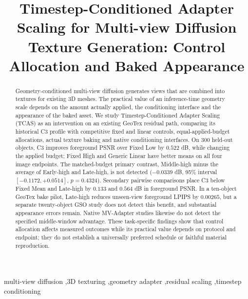 \documentclass[times,twocolumn,final]{elsarticle}
\begin{document}
\begin{frontmatter}

\title{Timestep-Conditioned Adapter Scaling for Multi-view Diffusion Texture Generation: Control Allocation and Baked Appearance}


\begin{abstract}
Geometry-conditioned multi-view diffusion generates views that are combined into textures for existing 3D meshes. The practical value of an inference-time geometry scale depends on the amount actually applied, the conditioning interface and the appearance of the baked asset. We study Timestep-Conditioned Adapter Scaling (TCAS) as an intervention on an existing GeoTex residual path, comparing its historical C3 profile with competitive fixed and linear controls, equal-applied-budget allocations, actual texture baking and native conditioning interfaces. On 300 held-out objects, C3 improves foreground PSNR over Fixed Low by $0.522$ dB, while changing the applied budget; Fixed High and Generic Linear have better means on all four image endpoints. The matched-budget primary contrast, Middle-high minus the average of Early-high and Late-high, is not detected ($-0.0339$ dB, 95\% interval $[-0.1172,+0.0514]$, $p=0.4324$). Secondary pairwise comparisons place C3 below Fixed Mean and Late-high by $0.133$ and $0.564$ dB in foreground PSNR. In a ten-object GeoTex bake pilot, Late-high reduces unseen-view foreground LPIPS by $0.00265$, but a separate twenty-object GSO study does not detect this benefit, and substantial appearance errors remain. Native MV-Adapter studies likewise do not detect the specified middle-window advantage. These task-specific findings show that control allocation affects measured outcomes while its practical value depends on protocol and endpoint; they do not establish a universally preferred schedule or faithful material reproduction.
\end{abstract}

\begin{keyword}
\KWD
multi-view diffusion \sep 3D texturing \sep geometry adapter \sep residual scaling \sep timestep conditioning
\end{keyword}

\end{frontmatter}

\raggedbottom
\linenumbers
\end{document}
